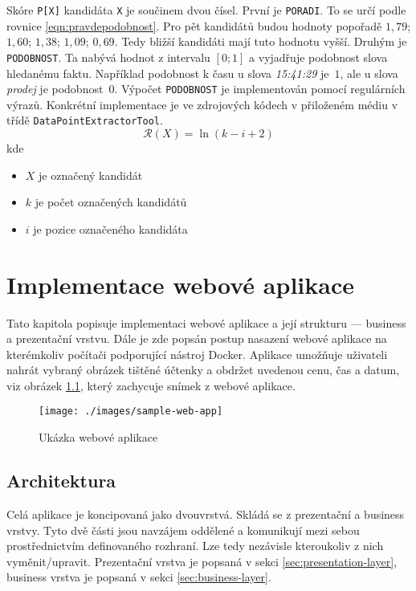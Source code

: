 \documentclass[thesis=B,czech]{FITthesis}[2019/12/23]
\def\myit#1{\texttt{#1}}
\begin{document}
Skóre \myit{P[X]} kandidáta \myit{X} je součinem dvou čísel. První je \myit{PORADI}. To se určí podle rovnice \ref{eqn:pravdepodobnost}. Pro pět kandidátů budou hodnoty popořadě $1,79$; $1,60$; $1,38$; $1,09$; $0,69$. Tedy bližší kandidáti mají tuto hodnotu vyšší. Druhým je \myit{PODOBNOST}. Ta nabývá hodnot z intervalu $[0; 1]$ a vyjadřuje podobnost slova hledanému faktu. Například podobnost k času u slova \textit{15:41:29} je~$1$, ale u slova \textit{prodej} je podobnost~$0$. Výpočet \myit{PODOBNOST} je implementován pomocí regulárních výrazů. Konkrétní implementace je ve zdrojových kódech v přiloženém médiu v třídě \myit{DataPointExtractorTool}.
\begin{equation}
	\mathcal{R}(X) = \ln(k-i+2)
	\label{eqn:pravdepodobnost}
\end{equation}
kde
\begin{itemize}[label=]
	\setlength\itemsep{-2pt}
	\item $X$ je označený kandidát
	\item $k$ je počet označených kandidátů
	\item $i$ je pozice označeného kandidáta
\end{itemize}

\chapter{Implementace webové aplikace}
\label{chapter:implementace-webove-aplikace}
Tato kapitola popisuje implementaci webové aplikace a její strukturu — business a prezentační vrstvu. Dále je zde popsán postup nasazení webové aplikace na kterémkoliv počítači podporující nástroj Docker. Aplikace umožňuje uživateli nahrát vybraný obrázek tištěné účtenky a obdržet uvedenou cenu, čas a datum, viz obrázek \ref{fig:sample-web-app}, který zachycuje snímek z webové aplikace.

\begin{figure}[H]\centering
	\texttt{[image: ./images/sample-web-app]}
	\caption[Ukázka webové aplikace]{Ukázka webové aplikace}\label{fig:sample-web-app}
\end{figure}

\section{Architektura}
Celá aplikace je koncipovaná jako dvouvrstvá. Skládá se z prezentační a business vrstvy. Tyto dvě části jsou navzájem oddělené a komunikují mezi sebou prostřednictvím definovaného rozhraní. Lze tedy nezávisle kteroukoliv z nich vyměnit/upravit. Prezentační vrstva je popsaná v sekci \ref{sec:presentation-layer}, business vrstva je popsaná v sekci \ref{sec:business-layer}.
\end{document}

